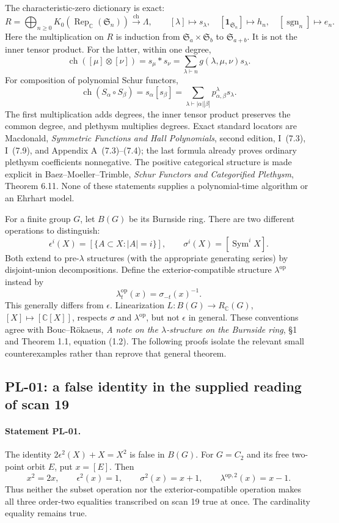\documentclass[11pt,a4paper]{article}
\begin{document}
The characteristic-zero dictionary is exact:
\[
 R=\bigoplus_{n\geq0}K_0(\operatorname{Rep}_{\mathbb C}(\mathfrak S_n))
 \xrightarrow{\operatorname{ch}}\Lambda,
 \qquad [\lambda]\longmapsto s_\lambda,
 \quad [\mathbf1_{\mathfrak S_n}]\longmapsto h_n,
 \quad [\operatorname{sgn}_n]\longmapsto e_n.
\]
Here the multiplication on $R$ is induction from
$\mathfrak S_a\times\mathfrak S_b$ to $\mathfrak S_{a+b}$. It is not the
inner tensor product. For the latter, within one degree,
\[
 \operatorname{ch}([\mu]\otimes[\nu])=s_\mu*s_\nu
   =\sum_{\lambda\vdash n}g(\lambda,\mu,\nu)s_\lambda.
\]
For composition of polynomial Schur functors,
\[
 \operatorname{ch}(S_\alpha\circ S_\beta)=s_\alpha[s_\beta]
   =\sum_{\lambda\vdash |\alpha||\beta|}p^\lambda_{\alpha,\beta}s_\lambda.
\]
The first multiplication adds degrees, the inner tensor product preserves the
common degree, and plethysm multiplies degrees. Exact standard locators are
Macdonald, \emph{Symmetric Functions and Hall Polynomials}, second edition,
I~(7.3), I~(7.9), and Appendix A~(7.3)--(7.4); the last formula already proves
ordinary plethysm coefficients nonnegative. The positive categorical structure
is made explicit in Baez--Moeller--Trimble, \emph{Schur Functors and Categorified
Plethysm}, Theorem 6.11. None of these statements supplies a polynomial-time
algorithm or an Ehrhart model.

For a finite group $G$, let $B(G)$ be its Burnside ring. There are two different
operations to distinguish:
\[
 \epsilon^i(X)=[\{A\subset X:|A|=i\}],\qquad
 \sigma^i(X)=[\operatorname{Sym}^iX].
\]
Both extend to pre-$\lambda$ structures (with the appropriate generating series)
by disjoint-union decompositions. Define the exterior-compatible structure
$\lambda^{\mathrm{op}}$ instead by
\[
 \lambda^{\mathrm{op}}_t(x)=\sigma_{-t}(x)^{-1}.
\]
This generally differs from $\epsilon$. Linearization
$L:B(G)\to R_{\mathbb C}(G)$, $[X]\mapsto[\mathbb C[X]]$, respects
$\sigma$ and $\lambda^{\mathrm{op}}$, but not $\epsilon$ in general.
These conventions agree with Bouc--R\"okaeus,
\emph{A note on the $\lambda$-structure on the Burnside ring},
\S1 and Theorem 1.1, equation (1.2). The following proofs isolate the relevant
small counterexamples rather than reprove that general theorem.

\subsection{PL-01: a false identity in the supplied reading of scan 19}
\paragraph{Statement PL-01.}
The identity $2\epsilon^2(X)+X=X^2$ is false in $B(G)$.
For $G=C_2$ and its free two-point orbit $E$, put $x=[E]$. Then
\[
 x^2=2x,\qquad \epsilon^2(x)=1,\qquad
 \sigma^2(x)=x+1,\qquad \lambda^{\mathrm{op},2}(x)=x-1.
\]
Thus neither the subset operation nor the exterior-compatible operation makes
all three order-two equalities transcribed on scan 19 true at once. The
cardinality equality remains true.
\end{document}
